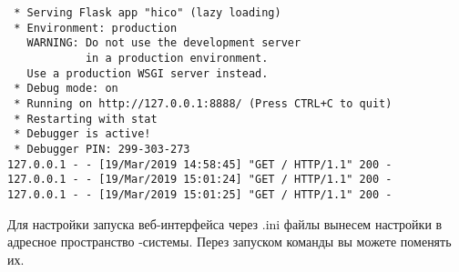 \smallskip
{}

\begin{verbatim}
 * Serving Flask app "hico" (lazy loading)
 * Environment: production
   WARNING: Do not use the development server
            in a production environment.
   Use a production WSGI server instead.
 * Debug mode: on
 * Running on http://127.0.0.1:8888/ (Press CTRL+C to quit)
 * Restarting with stat
 * Debugger is active!
 * Debugger PIN: 299-303-273
127.0.0.1 - - [19/Mar/2019 14:58:45] "GET / HTTP/1.1" 200 -
127.0.0.1 - - [19/Mar/2019 15:01:24] "GET / HTTP/1.1" 200 -
127.0.0.1 - - [19/Mar/2019 15:01:25] "GET / HTTP/1.1" 200 -
\end{verbatim}


Для настройки запуска веб-интерфейса через .ini файлы вынесем настройки в
адресное пространство \F-системы. Перез запуском команды  вы можете
поменять их.

\medskip
{}





\secup
